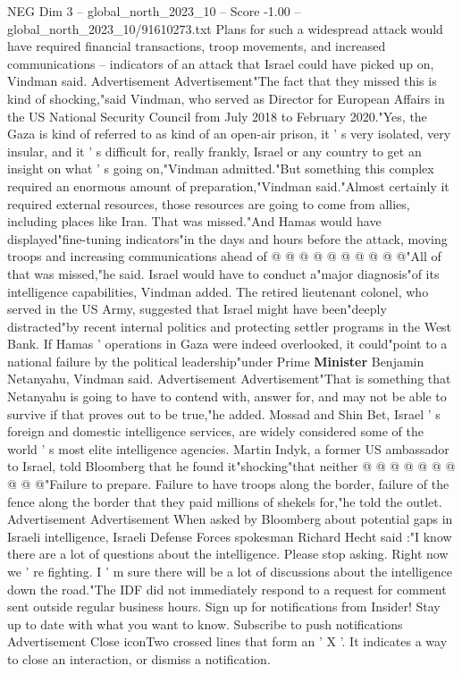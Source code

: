 \begin{textsample}{NEG Dim 3 – global\_north\_2023\_10 – Score -1.00 – global\_north\_2023\_10/91610273.txt}  \label{ex:f3_neg_254}
Plans for such a widespread attack would have required financial transactions, troop movements, and increased communications -- indicators of an attack that Israel could have picked up on, Vindman said.
Advertisement Advertisement"The fact that they missed this is kind of shocking,"said Vindman, who served as Director for European Affairs in the US National Security Council from July 2018 to February 2020."Yes, the Gaza is kind of referred to as kind of an open-air prison, it ' s very isolated, very insular, and it ' s difficult for, really frankly, Israel or any country to get an insight on what ' s going on,"Vindman admitted."But something this complex required an enormous amount of preparation,"Vindman said."Almost certainly it required external resources, those resources are going to come from allies, including places like Iran.
That was missed."And Hamas would have displayed"fine-tuning indicators"in the days and hours before the attack, moving troops and increasing communications ahead of @ @ @ @ @ @ @ @ @ @"All of that was missed,"he said.
Israel would have to conduct a"major diagnosis"of its intelligence capabilities, Vindman added.
The retired lieutenant colonel, who served in the US Army, suggested that Israel might have been"deeply distracted"by recent internal politics and protecting settler programs in the West Bank.
If Hamas ' operations in Gaza were indeed overlooked, it could"point to a national failure by the political leadership"under Prime \textbf{Minister} Benjamin Netanyahu, Vindman said.
Advertisement Advertisement"That is something that Netanyahu is going to have to contend with, answer for, and may not be able to survive if that proves out to be true,"he added.
Mossad and Shin Bet, Israel ' s foreign and domestic intelligence services, are widely considered some of the world ' s most elite intelligence agencies.
Martin Indyk, a former US ambassador to Israel, told Bloomberg that he found it"shocking"that neither @ @ @ @ @ @ @ @ @ @"Failure to prepare.
Failure to have troops along the border, failure of the fence along the border that they paid millions of shekels for,"he told the outlet.
Advertisement Advertisement When asked by Bloomberg about potential gaps in Israeli intelligence, Israeli Defense Forces spokesman Richard Hecht said :"I know there are a lot of questions about the intelligence.
Please stop asking.
Right now we ' re fighting.
I ' m sure there will be a lot of discussions about the intelligence down the road."The IDF did not immediately respond to a request for comment sent outside regular business hours.
Sign up for notifications from Insider!
Stay up to date with what you want to know.
Subscribe to push notifications Advertisement Close iconTwo crossed lines that form an ' X '.
It indicates a way to close an interaction, or dismiss a notification.

\end{textsample}
